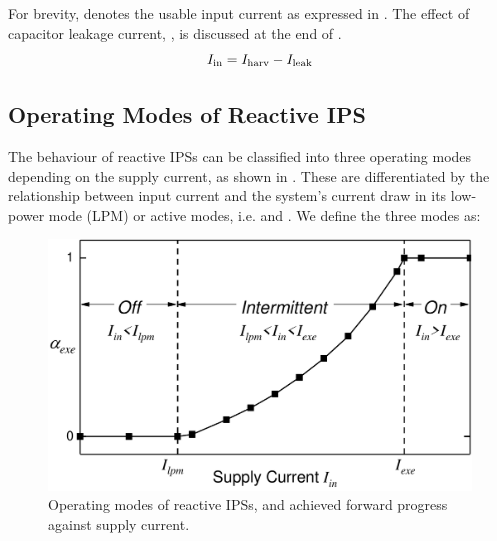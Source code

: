 For brevity,  denotes the usable input current as expressed in . 
The effect of capacitor leakage current, , is discussed at the end of .
\begin{equation}
    I_{\text{in}} = I_{\text{harv}} - I_{\text{leak}}
    \label{eq:in}
\end{equation}

\subsection{Operating Modes of Reactive IPS}

The behaviour of reactive IPSs can be classified into three operating modes depending on the supply current, as shown in . 
These are differentiated by the relationship between input current  and the system's current draw in its low-power mode (LPM) or active modes, i.e.  and . 
We define the three modes as:

\begin{figure}
    \centering
    \includegraphics[width=\columnwidth]{ch3_sizingeffect/figures/OperatingMode0Fig}
    \caption{Operating modes of reactive IPSs, and achieved forward progress against supply current.}
    \label{fig:operatingModes}
\end{figure}


